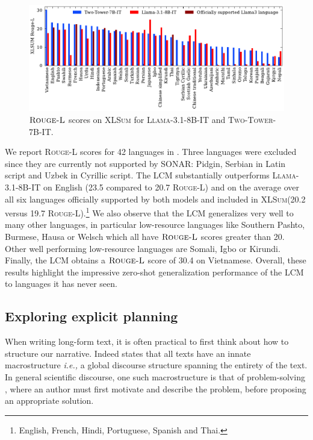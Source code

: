 \documentclass[twoside,11pt]{fairmeta}
\newcommand{\llamaIT}{\textsc{Llama-3.1-8B-IT}\xspace}
\newcommand{\sonar}{\textsc{SONAR}\xspace}
\newcommand{\lcm}{\textsc{LCM}\xspace}
\newcommand{\IFTtwotower}{\textsc{Two-Tower-7B-IT}\xspace}
\newcommand{\xlsum}{\textsc{XLSum}\xspace}
\newcommand{\rougellong}{\textsc{Rouge-L}\xspace}
\newcommand{\ie}{\textit{i.e.,}\xspace}
\begin{document}
\begin{figure}[!t]
    \centering
    \includegraphics[width=1\linewidth]{figures/lineplots/xlsum_rouge_l.pdf}
    \caption{$\rougellong$ scores on \xlsum for \llamaIT and \IFTtwotower.}
    \label{fig:scale:xlsum}
\end{figure}

We report \rougellong scores for 42 languages in . Three languages were excluded since they are currently not supported by \sonar: Pidgin, Serbian in Latin script and Uzbek in Cyrillic script.
The \lcm substantially outperforms \llamaIT on English (23.5 compared to 20.7 \rougellong) and on the average over all six languages officially supported by both models and included in \xlsum (20.2 versus 19.7 \rougellong).\footnote{English, French, Hindi, Portuguese, Spanish and Thai.}
We also observe that the \lcm generalizes very well to many other languages, in particular low-resource languages like Southern Pashto, Burmese, Hausa or Welsch which all have $\rougellong$ scores greater than 20. Other well performing low-resource languages are Somali, Igbo or Kirundi. Finally, the \lcm obtains a $\rougellong$ score of 30.4 on Vietnamese.
Overall, these results highlight the impressive zero-shot generalization performance of the \lcm to languages it has never seen. \subsection{Exploring explicit planning}
\label{sec:planlcm}

When writing long-form text, it is often practical to first think about how to structure our narrative. Indeed \citet{vandijk} states that all texts have an innate macrostructure \ie a global discourse structure spanning the entirety of the text. In general scientific discourse, one such macrostructure is that of problem-solving \citep{heffernan-teufel-2022-problem}, where an author must first motivate and describe the problem, before proposing an appropriate solution.
\end{document}
